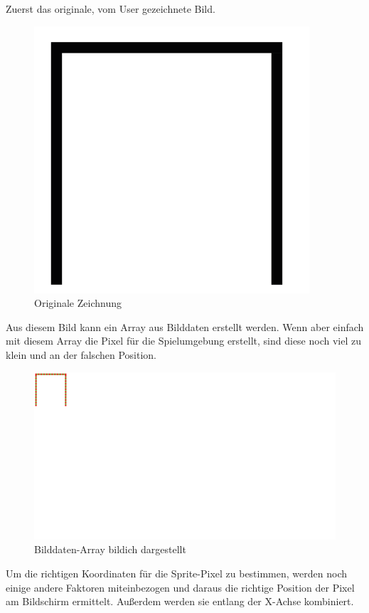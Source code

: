 Zuerst das originale, vom User gezeichnete Bild.
\begin{figure}[H]
    \centering
    \includegraphics[scale=0.5]{pics/simpleDrawing.PNG}
    \caption{Originale Zeichnung}
\end{figure}

Aus diesem Bild kann ein Array aus Bilddaten erstellt werden. Wenn aber einfach mit diesem Array
die Pixel für die Spielumgebung erstellt, sind diese noch viel zu klein und an der falschen Position.
\\
\begin{figure}[H]
    \centering
    \includegraphics[scale=0.5]{pics/simpleDrawing2.PNG}
    \caption{Bilddaten-Array bildich dargestellt}
\end{figure}

Um die richtigen Koordinaten für die Sprite-Pixel zu bestimmen, werden noch einige andere Faktoren miteinbezogen und daraus die richtige Position der Pixel am Bildschirm ermittelt.
Außerdem werden sie entlang der X-Achse kombiniert.

